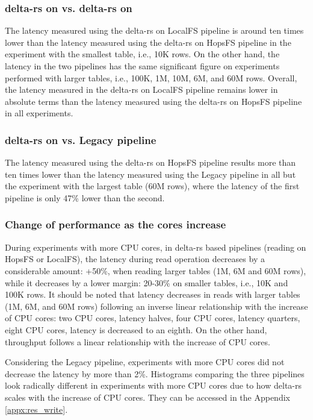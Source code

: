 \subsubsection*{delta-rs on  vs. delta-rs on }

The latency measured using the delta-rs on \gls{LocalFS} pipeline is around ten times lower than the latency measured using the delta-rs on \gls{HopsFS} pipeline in the experiment with the smallest table, i.e., 10K rows. On the other hand, the latency in the two pipelines has the same significant figure on experiments performed with larger tables, i.e., 100K, 1M, 10M, 6M, and 60M rows. Overall, the latency measured in the delta-rs on \gls{LocalFS} pipeline remains lower in absolute terms than the latency measured using the delta-rs on \gls{HopsFS} pipeline in all experiments.

\subsubsection*{delta-rs on  vs. Legacy pipeline}

The latency measured using the delta-rs on \gls{HopsFS} pipeline results more than ten times lower than the latency measured using the Legacy pipeline in all but the experiment with the largest table (60M rows), where the latency of the first pipeline is only 47\% lower than the second. 

\subsubsection*{Change of performance as the  cores increase}

During experiments with more \gls{CPU} cores, in delta-rs based pipelines (reading on \gls{HopsFS} or \gls{LocalFS}), the latency during read operation decreases by a considerable amount: +50\%, when reading larger tables (1M, 6M and 60M rows), while it decreases by a lower margin: 20-30\% on smaller tables, i.e., 10K and 100K rows. It should be noted that latency decreases in reads with larger tables (1M, 6M, and 60M rows) following an inverse linear relationship with the increase of \gls{CPU} cores: two \gls{CPU} cores, latency halves, four \gls{CPU} cores, latency quarters, eight \gls{CPU} cores, latency is decreased to an eighth. On the other hand, throughput follows a linear relationship with the increase of \gls{CPU} cores.

Considering the Legacy pipeline, experiments with more \gls{CPU} cores did not decrease the latency by more than 2\%. Histograms comparing the three pipelines look radically different in experiments with more \gls{CPU} cores due to how delta-rs scales with the increase of \gls{CPU} cores. They can be accessed in the Appendix \ref{appx:res_write}.

